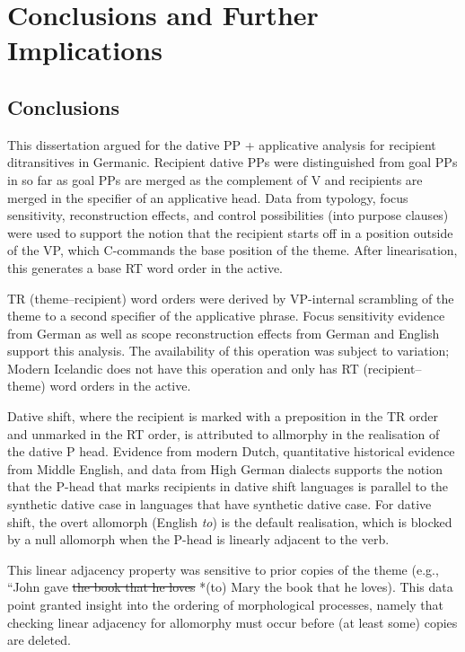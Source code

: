 \chapter{Conclusions and Further Implications}
\section{Conclusions}
This dissertation argued for the dative PP + applicative analysis for recipient ditransitives in Germanic. Recipient dative PPs were distinguished from goal PPs in so far as goal PPs are merged as the complement of V and recipients are merged in the specifier of an applicative head. Data from typology, focus sensitivity, reconstruction effects, and control possibilities (into purpose clauses) were used to support the notion that the recipient starts off in a position outside of the VP, which C-commands the base position of the theme. After linearisation, this generates a base RT word order in the active.

TR (theme--recipient) word orders were derived by VP-internal scrambling of the theme to a second specifier of the applicative phrase. Focus sensitivity evidence from German as well as scope reconstruction effects from German and English support this analysis. The availability of this operation was subject to variation; Modern Icelandic does not have this operation and only has RT (recipient--theme) word orders in the active. 

Dative shift, where the recipient is marked with a preposition in the TR order and unmarked in the RT order, is attributed to allmorphy in the realisation of the dative P head. Evidence from modern Dutch, quantitative historical evidence from Middle English, and data from High German dialects supports the notion that the P-head that marks recipients in dative shift languages is parallel to the synthetic dative case in languages that have synthetic dative case. For dative shift, the overt allomorph (English \textit{to}) is the default realisation, which is blocked by a null allomorph when the P-head is linearly adjacent to the verb.

This linear adjacency property was sensitive to prior copies of the theme (e.g., ``John gave \sout{the book that he loves} *(to) Mary the book that he loves). This data point granted insight into the ordering of morphological processes, namely that checking linear adjacency for allomorphy must occur before (at least some) copies are deleted.

